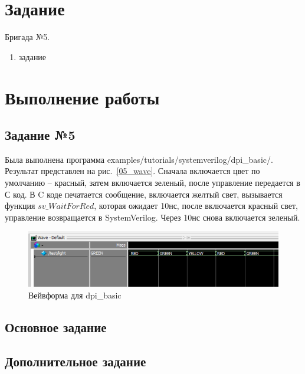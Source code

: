 \documentclass[a4paper,14pt]{article}
\begin{document}
    
    \tableofcontents
    \pagebreak


    \section{Задание}

    Бригада №5.

    \begin{enumerate}
        \item задание
    \end{enumerate}


    \section{Выполнение работы}

    \subsection{Задание №5}

    Была выполнена программа examples/tutorials/systemverilog/dpi_basic/.
    Результат представлен на рис.~\ref{05_wave}.
    Сначала включается цвет по умолчанию -- красный, затем включается зеленый, после управление передается в С код.
    В C коде печатается сообщение, включается желтый свет, вызывается функция $sv\_WaitForRed$, которая ожидает 10нс, 
    после включается красный свет, управление возвращается в SystemVerilog.
    Через 10нс снова включается зеленый.

    \begin{figure}[H]
        \centering
        \includegraphics[width=\linewidth]{images/05_wave}
        \caption{Вейвформа для dpi_basic}
        \label{fig:05_wave}
    \end{figure}
	
	{\small {}}

	\subsection{Основное задание}
	
	
	\subsection{Дополнительное задание}
	
\end{document}
